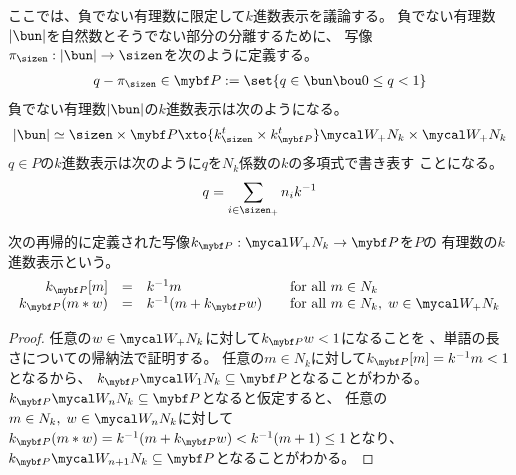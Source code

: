 	ここでは、負でない有理数に限定して$k$進数表示を議論する。
	負でない有理数$|\bun|$を自然数とそうでない部分の分離するために、
	写像$\pi_\sizen:|\bun|\to\sizen$を次のように定義する。
	\begin{equation*}\begin{split}
		q - \pi_\sizen\in \bunsub := \set{q\in\bun\bou 0\le q< 1}
	\end{split}\end{equation*}
	負でない有理数$|\bun|$の$k$進数表示は次のようになる。
	\begin{equation*}\begin{split}
		|\bun| \simeq \sizen\times\bunsub 
		\xto{k_\sizen^t\times k_\bunsub^t} \Word_+N_k\times\Word_+N_k
	\end{split}\end{equation*}
	$q\in P$の$k$進数表示は次のように$q$を$N_k$係数の$k$の多項式で書き表す
	ことになる。
	\begin{equation}\begin{split}
		q = \sum_{i\in\sizen_+}n_ik^{-1}
	\end{split}\end{equation}

	\begin{definition}[有理数のk進数表示のデコード]
	\label{def:有理数のk進数表示のデコード} %
		次の再帰的に定義された写像$k_\bunsub:\Word_+N_k\to\bunsub$を$P$の
		有理数の$k$進数表示という。
		{\setlength\arraycolsep{1pt}
		\begin{equation*}\begin{array}{rcll}
			k_\bunsub[m] &=& k^{-1}m &\quad\text{for all }m\in N_k \\
			k_\bunsub(m*w) &=& k^{-1}(m + k_\bunsub w)
				& \quad\text{for all }m\in N_k,\;w\in \Word_+N_k \\
		\end{array}\end{equation*}
		}
	\end{definition} %
	\begin{proof} 任意の$w\in\Word_+N_k$に対して$k_\bunsub w<1$になることを
	、単語の長さについての帰納法で証明する。
	任意の$m\in N_k$に対して$k_\bunsub[m]=k^{-1}m<1$となるから、
	$k_\bunsub\Word_1N_k\subseteq\bunsub$となることがわかる。
	$k_\bunsub\Word_nN_k\subseteq\bunsub$となると仮定すると、
	任意の$m\in N_k,\;w\in\Word_nN_k$に対して
	$k_\bunsub(m*w)=k^{-1}(m+k_\bunsub w)<k^{-1}(m+1)\le1$となり、
	$k_\bunsub\Word_{n+1}N_k\subseteq\bunsub$となることがわかる。
	\end{proof}

